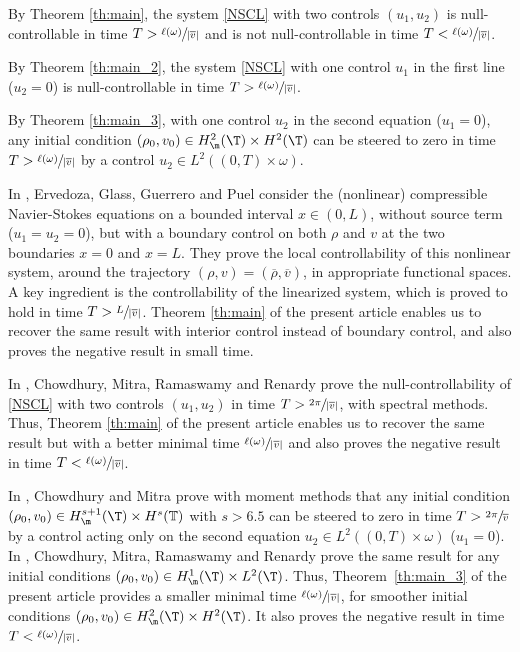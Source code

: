 By Theorem \ref{th:main}, the system \eqref{NSCL} with two controls $(u_1,u_2)$ is null-controllable in time $T>\sfrac{\ell(\omega)}{|\overline{v}|}$ and is not null-controllable in time $T<\sfrac{\ell(\omega)}{|\overline{v}|}$.

By Theorem \ref{th:main_2}, the system \eqref{NSCL} with one control $u_1$ in the first line (\ie $u_2=0$) is null-controllable in time $T>\sfrac{\ell(\omega)}{|\overline{v}|}$.

By Theorem \ref{th:main_3}, with one control $u_2$ in the second equation (\ie $u_1=0$), any initial condition $(\rho_0,v_0)\in H^2_\m(\T)\times H^2(\T)$ can be steered to zero in time $T>\sfrac{\ell(\omega)}{|\overline{v}|}$ by a control $u_2 \in L^2((0,T)\times\omega)$.

In \cite{ervedoza_2012}, Ervedoza, Glass, Guerrero and Puel consider the (nonlinear) compressible Navier-Stokes equations on a bounded interval $x \in (0,L)$, without source term (\ie $u_1=u_2=0$), but with a boundary control on both $\rho$ and $v$ at the two boundaries $x=0$ and $x=L$. They prove the local controllability of this nonlinear system, around the trajectory $(\rho,v)=(\overline{\rho},\overline{v})$, in appropriate functional spaces. A key ingredient is the controllability of the linearized system, which is proved to hold in time $T>\sfrac{L}{|\overline{v}|}$. Theorem \ref{th:main} of the present article enables us to recover the same result with interior control instead of boundary control, and also proves the negative result in small time.

In \cite[Th.\,1.4]{chowdhury_2014}, Chowdhury, Mitra, Ramaswamy and Renardy prove the null-controllability of \eqref{NSCL} with two controls $(u_1,u_2)$ in time $T>\sfrac{2\pi}{|\overline{v}|}$, with spectral methods. Thus, Theorem \ref{th:main} of the present article enables us to recover the same result but with a better minimal time $\sfrac{\ell(\omega)}{|\overline{v}|}$ and also proves the negative result in time $T<\sfrac{\ell(\omega)}{|\overline{v}|}$.

In \cite[Th.\,1.3]{chowdhury_2015}, Chowdhury and Mitra prove with moment methods that any initial condition $(\rho_0,v_0)\in H^{s+1}_\m(\T)\times H^{s}(\mathbb{T})$ with $s> 6.5$ can be steered to zero in time $T>\sfrac{2\pi}{\overline{v}}$ by a control acting only on the second equation $u_2 \in L^2((0,T)\times\omega)$ (\ie $u_1=0$).
In \cite[Th.\,1.2]{chowdhury_2014}, Chowdhury, Mitra, Ramaswamy and Renardy prove the same result for any initial conditions $(\rho_0,v_0)\in H^1_\m(\T) \times L^2(\T)$. Thus, Theorem~\ref{th:main_3} of the present article provides a smaller minimal time $\sfrac{\ell(\omega)}{|\overline{v}|}$, for smoother initial conditions $(\rho_0,v_0)\in H^2_\m(\T)\times H^2(\T)$. It also proves the negative result in time $T<\nobreak\sfrac{\ell(\omega)}{|\overline{v}|}$.

